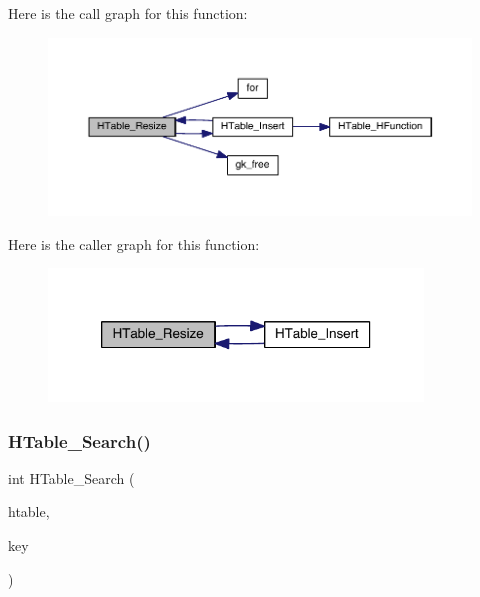 Here is the call graph for this function\+:\nopagebreak
\begin{figure}[H]
\begin{center}
\leavevmode
\includegraphics[width=350pt]{a00098_ad79cb786b03a73481fb3e5846d345801_cgraph}
\end{center}
\end{figure}
Here is the caller graph for this function\+:\nopagebreak
\begin{figure}[H]
\begin{center}
\leavevmode
\includegraphics[width=282pt]{a00098_ad79cb786b03a73481fb3e5846d345801_icgraph}
\end{center}
\end{figure}
\mbox{\label{a00098_a2b610fbd6017e0ef2e393c563b4809a5}} 
\subsubsection{\texorpdfstring{H\+Table\+\_\+\+Search()}{HTable\_Search()}}
{\footnotesize\ttfamily int H\+Table\+\_\+\+Search (\begin{DoxyParamCaption}\item[{\hyperlink{a00650}{gk\+\_\+\+H\+Table\+\_\+t} $\ast$}]{htable,  }\item[{int}]{key }\end{DoxyParamCaption})}

